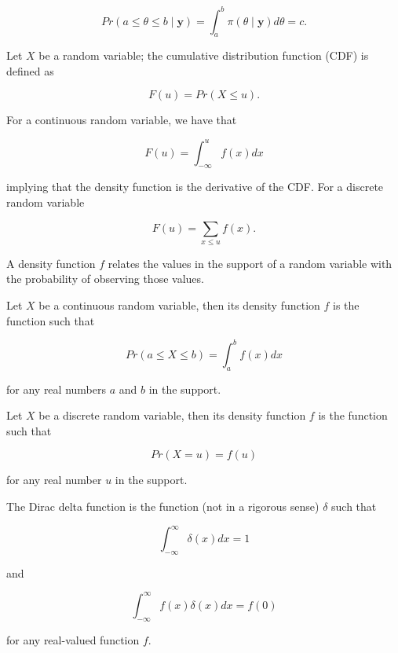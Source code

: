 \documentclass[
  letterpaper,
  DIV=11,
  numbers=noendperiod]{scrreprt}
\providecommand{\tightlist}{%
  \setlength{\itemsep}{0pt}\setlength{\parskip}{0pt}}\usepackage{longtable,booktabs,array}
\theoremstyle{definition}
\theoremstyle{definition}
\theoremstyle{plain}
\theoremstyle{remark}
\begin{document}
\[Pr(a \leq \theta \leq b \mid \mathbf{y}) = \int_{a}^{b} \pi(\theta \mid \mathbf{y})d\theta = c.\]

\begin{description}
\tightlist
\item[Cumulative Distribution Function (CDF) (Definition~\ref{def-cdf})]
Let \(X\) be a random variable; the cumulative distribution function
(CDF) is defined as
\end{description}

\[F(u) = Pr(X \leq u).\]

For a continuous random variable, we have that

\[F(u) = \int_{-\infty}^{u} f(x) dx\]

implying that the density function is the derivative of the CDF. For a
discrete random variable

\[F(u) = \sum_{x \leq u} f(x).\]

\begin{description}
\tightlist
\item[Density Function (Definition~\ref{def-density-function})]
A density function \(f\) relates the values in the support of a random
variable with the probability of observing those values.
\end{description}

Let \(X\) be a continuous random variable, then its density function
\(f\) is the function such that

\[Pr(a \leq X \leq b) = \int_a^b f(x) dx\]

for any real numbers \(a\) and \(b\) in the support.

Let \(X\) be a discrete random variable, then its density function \(f\)
is the function such that

\[Pr(X = u) = f(u)\]

for any real number \(u\) in the support.

\begin{description}
\tightlist
\item[Dirac Delta Function (Definition~\ref{def-dirac-delta})]
The Dirac delta function is the function (not in a rigorous sense)
\(\delta\) such that
\end{description}

\[\int_{-\infty}^{\infty} \delta(x) dx = 1\]

and

\[\int_{-\infty}^{\infty} f(x) \delta(x) dx = f(0)\]

for any real-valued function \(f\).
\end{document}

